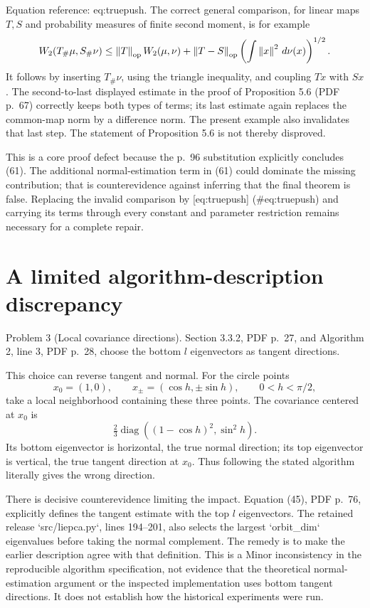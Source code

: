 \documentclass[10pt]{article}
\begin{document}
Equation reference: eq:truepush. The correct general comparison, for linear maps \(T,S\) and probability measures of finite second moment, is for example \[
 W_2(T_\#\mu,S_\#\nu)
 \le \left\lVert T\right\rVert_{\rm op}W_2(\mu,\nu)
       +\left\lVert T-S\right\rVert_{\rm op}
                    \left(\int\left\lVert x\right\rVert^2\,d\nu(x)\right)^{1/2}.\] It follows by inserting \(T_\#\nu\), using the triangle inequality, and coupling \(Tx\) with \(Sx\). The second-to-last displayed estimate in the proof of Proposition 5.6 (PDF p. 67) correctly keeps both types of terms; its last estimate again replaces the common-map norm by a difference norm. The present example also invalidates that last step. The statement of Proposition 5.6 is not thereby disproved.\par
This is a core proof defect because the p. 96 substitution explicitly concludes (61). The additional normal-estimation term in (61) could dominate the missing contribution; that is counterevidence against inferring that the final theorem is false. Replacing the invalid comparison by [eq:truepush] (\#eq:truepush) and carrying its terms through every constant and parameter restriction remains necessary for a complete repair.\par
\section*{A limited algorithm-description discrepancy}
Problem 3 (Local covariance directions).  Section 3.3.2, PDF p. 27, and Algorithm 2, line 3, PDF p. 28, choose the bottom \(l\) eigenvectors as tangent directions.\par
This choice can reverse tangent and normal. For the circle points \[x_0=(1,0),\qquad x_\pm=(\cos h,\pm\sin h),\qquad 0<h<\pi/2,\] take a local neighborhood containing these three points. The covariance centered at \(x_0\) is \[\tfrac23\operatorname{diag}((1-\cos h)^2,\sin^2h).\] Its bottom eigenvector is horizontal, the true normal direction; its top eigenvector is vertical, the true tangent direction at \(x_0\). Thus following the stated algorithm literally gives the wrong direction.\par
There is decisive counterevidence limiting the impact. Equation (45), PDF p. 76, explicitly defines the tangent estimate with the top \(l\) eigenvectors. The retained release `src/liepca.py`, lines 194–201, also selects the largest `orbit\_dim` eigenvalues before taking the normal complement. The remedy is to make the earlier description agree with that definition. This is a Minor inconsistency in the reproducible algorithm specification, not evidence that the theoretical normal-estimation argument or the inspected implementation uses bottom tangent directions. It does not establish how the historical experiments were run.\par
\end{document}

